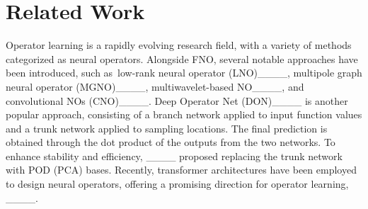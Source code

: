 \section{Related Work}
Operator learning is a rapidly evolving research field, with a variety of methods categorized as neural operators. Alongside FNO, several notable approaches have been introduced, such as~low-rank neural operator (LNO)____, multipole graph neural operator (MGNO)____,  multiwavelet-based NO____, and convolutional NOs (CNO)____. Deep Operator Net (DON)____ is another popular  approach, consisting  of a branch network applied to input function values and a trunk network applied to sampling locations. The final prediction is obtained through the dot product of the outputs from the two networks. To enhance stability and efficiency, ____ proposed replacing the trunk network with POD (PCA) bases. Recently, transformer architectures have been employed to design neural operators, offering a promising direction for operator learning, \eg____.



